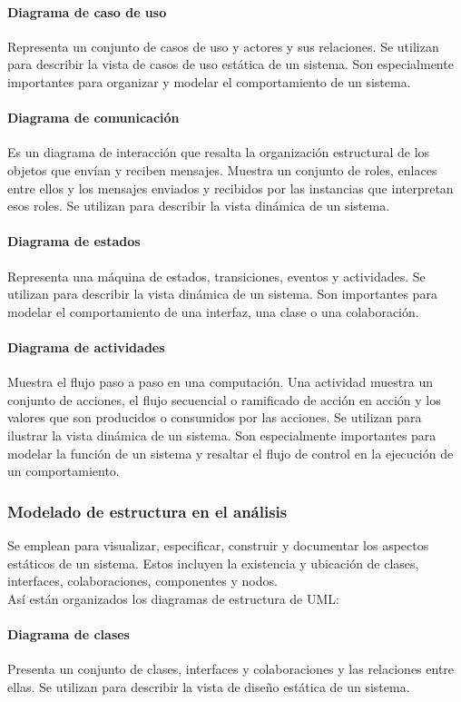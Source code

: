 \paragraph{Diagrama de caso de uso} 
Representa un conjunto de casos de uso y actores y sus relaciones. Se utilizan para describir la vista de casos de uso estática de un sistema. Son especialmente importantes para organizar y modelar el comportamiento de un sistema.
\paragraph{Diagrama de comunicación}
Es un diagrama de interacción que resalta la organización estructural de los objetos que envían y reciben mensajes. Muestra un conjunto de roles, enlaces entre ellos y los mensajes enviados y recibidos por las instancias que interpretan esos roles. Se utilizan para describir la vista dinámica de un sistema.
\paragraph{Diagrama de estados}
Representa una máquina de estados, transiciones, eventos y actividades. Se utilizan para describir la vista dinámica de un sistema. Son importantes para modelar el comportamiento de una interfaz, una clase o una colaboración.
\paragraph{Diagrama de actividades}
Muestra el flujo paso a paso en una computación. Una actividad muestra un conjunto de acciones, el flujo secuencial o ramificado de acción en acción y los valores que son producidos o consumidos por las acciones. Se utilizan para ilustrar la vista dinámica de un sistema. Son especialmente importantes para modelar la función de un sistema y resaltar el flujo de control en la ejecución de un comportamiento.
\subsubsection{Modelado de estructura en el análisis}
Se emplean para visualizar, especificar, construir y documentar los aspectos estáticos de un sistema. Estos incluyen la existencia y ubicación de clases, interfaces, colaboraciones, componentes y nodos.\\
Así están organizados los diagramas de estructura de UML:
\paragraph{Diagrama de clases}
Presenta un conjunto de clases, interfaces y colaboraciones y las relaciones entre ellas. Se utilizan para describir la vista de diseño estática de un sistema.
